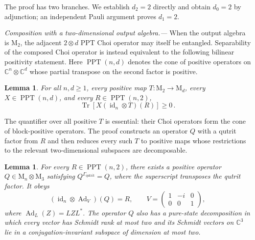\documentclass[aps,prl,reprint,superscriptaddress,nofootinbib]{revtex4-2}
\newcommand{\M}{\mathrm{M}}
\newcommand{\C}{\mathbb C}
\newcommand{\id}{\operatorname{id}}
\newcommand{\Ad}{\operatorname{Ad}}
\newcommand{\Tr}{\operatorname{Tr}}
\newcommand{\PPT}{\operatorname{PPT}}
\newtheorem{lemma}[theorem]{Lemma}
\begin{document}
The proof has two branches.  We establish $d_2=2$ directly and obtain
$d_0=2$ by adjunction; an independent Pauli argument proves $d_1=2$.

\textit{Composition with a two-dimensional output algebra.---}
When the output algebra is $\M_2$, the adjacent $2\otimes d$ PPT Choi
operator may itself be entangled.  Separability of the composed Choi operator
is instead equivalent to the following bilinear positivity statement.  Here
$\PPT(n,d)$ denotes the cone of positive operators on
$\C^n\otimes\C^d$ whose partial transpose on the second factor is positive.

\begin{lemma}
\label{thm:bilinear}
For all $n,d\geq1$, every positive map $T:\M_2\to\M_d$, every
$X\in\PPT(n,d)$, and every $R\in\PPT(n,2)$,
\begin{equation}
 \Tr\!\left[X(\id_n\otimes T)(R)\right]\geq0\,.
\label{eq:bilinear}
\end{equation}
\end{lemma}

The quantifier over all positive $T$ is essential: their Choi operators form
the cone of block-positive operators.  The proof constructs an operator $Q$
with a qutrit factor
from $R$ and then reduces every such $T$ to positive maps whose restrictions
to the relevant two-dimensional subspaces are decomposable.

\begin{lemma}
\label{lem:auxiliaryQ}
For every $R\in\PPT(n,2)$, there exists a positive operator
$Q\in\M_n\otimes\M_3$ satisfying
$Q^{\Gamma_{\mathrm{qutrit}}}=Q$, where the superscript transposes the
qutrit factor.  It obeys
\begin{equation}
 (\id_n\otimes\Ad_V)(Q)=R,\qquad
 V=\begin{pmatrix}1&-i&0\\0&0&1\end{pmatrix},
\label{eq:recovery}
\end{equation}
where $\Ad_L(Z)=LZL^*$.  The operator $Q$ also has a pure-state decomposition
in which every vector has Schmidt rank at
most two and its Schmidt vectors on $\C^3$ lie in a conjugation-invariant
subspace of dimension at most two.
\end{lemma}
\end{document}
